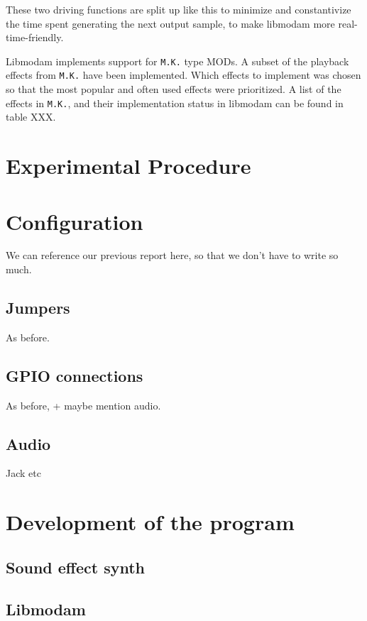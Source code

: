 These two driving functions are split up like this to minimize and constantivize the time spent generating the next output sample, to make libmodam more real-time-friendly.

Libmodam implements support for \texttt{M.K.} type MODs.
A subset of the playback effects from \texttt{M.K.} have been implemented.
Which effects to implement was chosen so that the most popular and often used effects were prioritized.
A list of the effects in \texttt{M.K.}, and their implementation status in libmodam can be found in table XXX.


\section{Experimental Procedure}


\section{Configuration}

We can reference our previous report here, so that we don't have to write so much.

\subsection{Jumpers}

As before.

\subsection{GPIO connections}

As before, + maybe mention audio.

\subsection{Audio}

Jack etc

\section{Development of the program}



\subsection{Sound effect synth}

\subsection{Libmodam}

